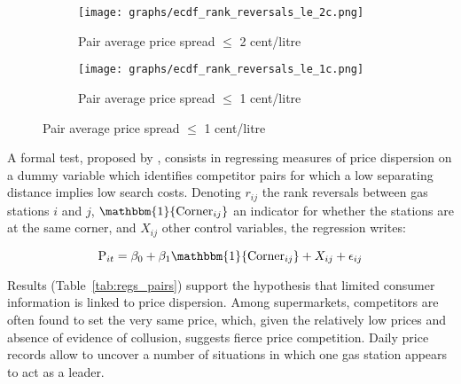 \documentclass[english]{article}
\begin{document}
\begin{figure}[H]
\centering
\caption{Empirical distribution functions of rank reversals (raw prices)}
\label{tab:ecdf_rr_distance}
\begin{subfigure}{.49\textwidth}
\centering
\texttt{[image: graphs/ecdf\_rank\_reversals\_le\_2c.png]}
\caption[short]{Pair average price spread $\le$ 2 cent/litre}
\end{subfigure}
\begin{subfigure}{.49\textwidth}
\centering
\texttt{[image: graphs/ecdf\_rank\_reversals\_le\_1c.png]}
\caption[short]{Pair average price spread $\le$ 1 cent/litre}
\end{subfigure}
\end{figure}

A formal test, proposed by \cite{TAP11}, consists in regressing measures of price dispersion on a dummy variable which identifies competitor pairs for which a low separating distance implies low search costs. Denoting $r_{ij}$ the rank reversals between gas stations $i$ and $j$, $\mathbbm{1}{\text{Corner}_{ij}}$ an indicator for whether the stations are at the same corner, and $X_{ij}$ other control variables, the regression writes:

\begin{equation}
\text{P}_{it}= \beta_0 + \beta_1 \mathbbm{1}{\text{Corner}_{ij}} + X_{ij} + \epsilon_{ij}
\end{equation}

Results (Table~\ref{tab:regs_pairs}) support the hypothesis that limited consumer information is linked to price dispersion. Among supermarkets, competitors are often found to set the very same price, which, given the relatively low prices and absence of evidence of collusion, suggests fierce price competition. Daily price records allow to uncover a number of situations in which one gas station appears to act as a leader.
\end{document}
